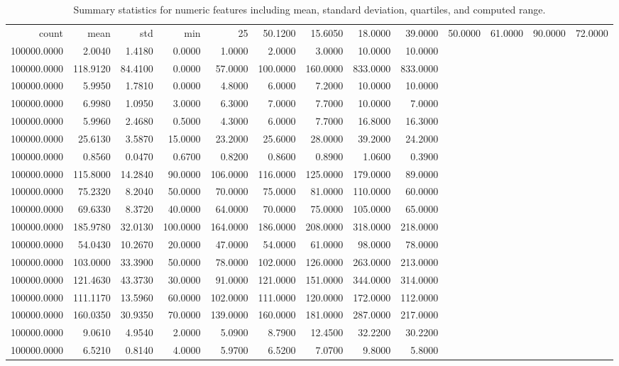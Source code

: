 \begin{table}[H]
\begin{center}
\begin{tabular}{rrrrrrrrr}
\toprule
count & mean & std & min & 25%
 & 50.1200 & 15.6050 & 18.0000 & 39.0000 & 50.0000 & 61.0000 & 90.0000 & 72.0000 \\
100000.0000 & 2.0040 & 1.4180 & 0.0000 & 1.0000 & 2.0000 & 3.0000 & 10.0000 & 10.0000 \\
100000.0000 & 118.9120 & 84.4100 & 0.0000 & 57.0000 & 100.0000 & 160.0000 & 833.0000 & 833.0000 \\
100000.0000 & 5.9950 & 1.7810 & 0.0000 & 4.8000 & 6.0000 & 7.2000 & 10.0000 & 10.0000 \\
100000.0000 & 6.9980 & 1.0950 & 3.0000 & 6.3000 & 7.0000 & 7.7000 & 10.0000 & 7.0000 \\
100000.0000 & 5.9960 & 2.4680 & 0.5000 & 4.3000 & 6.0000 & 7.7000 & 16.8000 & 16.3000 \\
100000.0000 & 25.6130 & 3.5870 & 15.0000 & 23.2000 & 25.6000 & 28.0000 & 39.2000 & 24.2000 \\
100000.0000 & 0.8560 & 0.0470 & 0.6700 & 0.8200 & 0.8600 & 0.8900 & 1.0600 & 0.3900 \\
100000.0000 & 115.8000 & 14.2840 & 90.0000 & 106.0000 & 116.0000 & 125.0000 & 179.0000 & 89.0000 \\
100000.0000 & 75.2320 & 8.2040 & 50.0000 & 70.0000 & 75.0000 & 81.0000 & 110.0000 & 60.0000 \\
100000.0000 & 69.6330 & 8.3720 & 40.0000 & 64.0000 & 70.0000 & 75.0000 & 105.0000 & 65.0000 \\
100000.0000 & 185.9780 & 32.0130 & 100.0000 & 164.0000 & 186.0000 & 208.0000 & 318.0000 & 218.0000 \\
100000.0000 & 54.0430 & 10.2670 & 20.0000 & 47.0000 & 54.0000 & 61.0000 & 98.0000 & 78.0000 \\
100000.0000 & 103.0000 & 33.3900 & 50.0000 & 78.0000 & 102.0000 & 126.0000 & 263.0000 & 213.0000 \\
100000.0000 & 121.4630 & 43.3730 & 30.0000 & 91.0000 & 121.0000 & 151.0000 & 344.0000 & 314.0000 \\
100000.0000 & 111.1170 & 13.5960 & 60.0000 & 102.0000 & 111.0000 & 120.0000 & 172.0000 & 112.0000 \\
100000.0000 & 160.0350 & 30.9350 & 70.0000 & 139.0000 & 160.0000 & 181.0000 & 287.0000 & 217.0000 \\
100000.0000 & 9.0610 & 4.9540 & 2.0000 & 5.0900 & 8.7900 & 12.4500 & 32.2200 & 30.2200 \\
100000.0000 & 6.5210 & 0.8140 & 4.0000 & 5.9700 & 6.5200 & 7.0700 & 9.8000 & 5.8000 \\
\bottomrule
\end{tabular}
\end{center}
\vspace{-5pt}
\caption{Summary statistics for numeric features including mean, standard deviation, quartiles, and computed range.}
\label{tab:numeric_summary_statistics}
\end{table}
